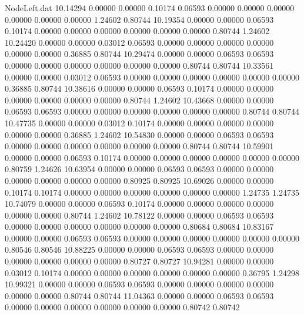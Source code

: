 \begin{filecontents}{NodeLeft.dat}
  10.14294    0.00000    0.00000     0.10174    0.06593    0.00000    0.00000    0.00000    0.00000    0.00000    0.00000    1.24602    0.80744
  10.19354    0.00000    0.00000     0.06593    0.10174    0.00000    0.00000    0.00000    0.00000    0.00000    0.00000    0.80744    1.24602
  10.24420    0.00000    0.00000     0.03012    0.06593    0.00000    0.00000    0.00000    0.00000    0.00000    0.00000    0.36885    0.80744
  10.29474    0.00000    0.00000     0.06593    0.06593    0.00000    0.00000    0.00000    0.00000    0.00000    0.00000    0.80744    0.80744
  10.33561    0.00000    0.00000     0.03012    0.06593    0.00000    0.00000    0.00000    0.00000    0.00000    0.00000    0.36885    0.80744
  10.38616    0.00000    0.00000     0.06593    0.10174    0.00000    0.00000    0.00000    0.00000    0.00000    0.00000    0.80744    1.24602
  10.43668    0.00000    0.00000     0.06593    0.06593    0.00000    0.00000    0.00000    0.00000    0.00000    0.00000    0.80744    0.80744
  10.47735    0.00000    0.00000     0.03012    0.10174    0.00000    0.00000    0.00000    0.00000    0.00000    0.00000    0.36885    1.24602
  10.54830    0.00000    0.00000     0.06593    0.06593    0.00000    0.00000    0.00000    0.00000    0.00000    0.00000    0.80744    0.80744
  10.59901    0.00000    0.00000     0.06593    0.10174    0.00000    0.00000    0.00000    0.00000    0.00000    0.00000    0.80759    1.24626
  10.63954    0.00000    0.00000     0.06593    0.06593    0.00000    0.00000    0.00000    0.00000    0.00000    0.00000    0.80925    0.80925
  10.69026    0.00000    0.00000     0.10174    0.10174    0.00000    0.00000    0.00000    0.00000    0.00000    0.00000    1.24735    1.24735
  10.74079    0.00000    0.00000     0.06593    0.10174    0.00000    0.00000    0.00000    0.00000    0.00000    0.00000    0.80744    1.24602
  10.78122    0.00000    0.00000     0.06593    0.06593    0.00000    0.00000    0.00000    0.00000    0.00000    0.00000    0.80684    0.80684
  10.83167    0.00000    0.00000     0.06593    0.06593    0.00000    0.00000    0.00000    0.00000    0.00000    0.00000    0.80546    0.80546
  10.88225    0.00000    0.00000     0.06593    0.06593    0.00000    0.00000    0.00000    0.00000    0.00000    0.00000    0.80727    0.80727
  10.94281    0.00000    0.00000     0.03012    0.10174    0.00000    0.00000    0.00000    0.00000    0.00000    0.00000    0.36795    1.24298
  10.99321    0.00000    0.00000     0.06593    0.06593    0.00000    0.00000    0.00000    0.00000    0.00000    0.00000    0.80744    0.80744
  11.04363    0.00000    0.00000     0.06593    0.06593    0.00000    0.00000    0.00000    0.00000    0.00000    0.00000    0.80742    0.80742

\end{filecontents}
